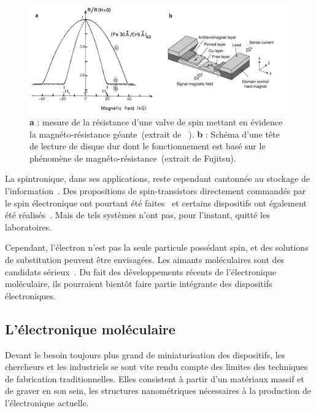 \begin{figure}
\centering \includegraphics[scale=0.45]{Spintronique/SpinValve/SpinValve.pdf}
\caption{\textbf{a} : mesure de la résistance d'une valve de spin mettant en évidence la magnéto-résistance géante~(extrait de ~\cite{Baibich1988}).  \textbf{b} : Schéma d'une tête de lecture de disque dur dont le fonctionnement est basé sur le phénomène de magnéto-résistance~(extrait de Fujitsu).}
\label{SpinValve}
\end{figure}



La spintronique, dans ses applications, reste cependant cantonnée au stockage de  l'information~\cite{Awschalom2007}. Des propositions de spin-transistors directement commandés par le spin électronique ont pourtant été faites~\cite{Datta1990} et certains dispositifs ont également été réalisés~\cite{Johnson1996,Huang2007}. Mais de tels systèmes n'ont pas, pour l'instant, quitté les laboratoires.

Cependant, l'électron n'est pas la seule particule possédant spin, et des solutions de substitution peuvent être envisagées. Les aimants moléculaires sont des candidats sérieux~\cite{Bogani2008}. Du fait des développements récents de l'électronique moléculaire, ils pourraient bientôt faire partie intégrante des dispositifs électroniques.

\subsection{L'électronique moléculaire}
Devant le besoin toujours plus grand de miniaturisation des dispositifs, les chercheurs et les industriels se sont vite rendu compte des limites des techniques de fabrication traditionnelles. Elles consistent à partir d'un matériaux massif et de graver en son sein, les structures nanométriques nécessaires à la production de l'électronique actuelle.

